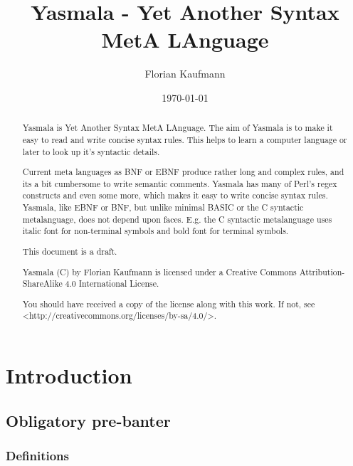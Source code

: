 \documentclass[a4paper]{report}
\begin{document}
\author{Florian Kaufmann}
\title{Yasmala - Yet Another Syntax MetA LAnguage}
\date{\today}
\maketitle

\begin{abstract}
Yasmala is Yet Another Syntax MetA LAnguage. The aim of Yasmala is to make it
easy to read and write concise syntax rules. This helps to learn a computer
language or later to look up it's syntactic details.

Current meta languages as BNF or EBNF produce rather long and complex rules, and
its a bit cumbersome to write semantic comments. Yasmala has many of Perl's
regex constructs and even some more, which makes it easy to write concise syntax
rules. Yasmala, like EBNF or BNF, but unlike minimal BASIC or the C syntactic
metalanguage, does not depend upon faces. E.g. the C syntactic metalanguage uses
italic font for non-terminal symbols and bold font for terminal symbols.

This document is a draft.

Yasmala (C) by Florian Kaufmann is licensed under a Creative Commons
Attribution-ShareAlike 4.0 International License.

You should have received a copy of the license along with this work. If not,
see <http://creativecommons.org/licenses/by-sa/4.0/>.
\end{abstract}

\tableofcontents

\chapter{Introduction}

\section{Obligatory pre-banter}

\subsection{Definitions}
\end{document}
